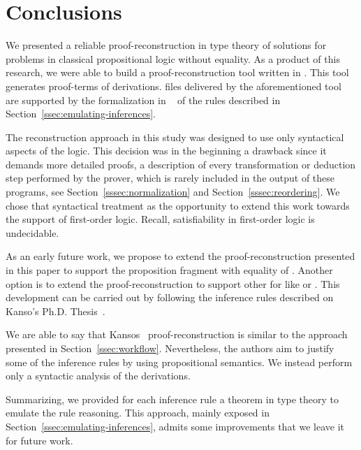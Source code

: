 \documentclass[../main.tex]{subfiles}
\begin{document}

\section{Conclusions}
\label{sec:conclusions}

We presented a reliable proof-reconstruction in type theory of \Metis
solutions for problems in classical propositional logic without
equality. As a product of this research, we were able to build a
proof-reconstruction tool written in \Haskell. This tool generates
\Agda proof-terms of \Metis \TSTP derivations. \Agda files
delivered by the aforementioned tool are supported by the
formalization in \Agda~\cite{AgdaProp,AgdaMetis} of the \Metis rules
described in Section~\ref{ssec:emulating-inferences}.

The reconstruction approach in this study was designed to use
only syntactical aspects of the logic.
This decision was in the beginning a drawback
since it demands more detailed proofs, a
description of every transformation or deduction step performed by
the prover, which is rarely included in the output of these programs,
see Section~\ref{sssec:normalization} and Section~\ref{sssec:reordering}.
We chose that syntactical treatment as the opportunity
to extend this work towards the support of first-order logic.
Recall, satisfiability in first-order logic is undecidable.

As an early future work, we propose to extend the
proof-reconstruction presented in this paper to support the
proposition fragment with equality of \Metis.
Another option is to extend the proof-reconstruction to support other \ATPs
for \CPL like  or .
This development can be carried out by following the 
inference rules described on Kanso's Ph.D. Thesis~\cite{Kanso2012}.

We are able to say that Kansos~\cite{Kanso2012} proof-reconstruction is 
similar to the approach presented in Section~\ref{ssec:workflow}.
Nevertheless, the authors aim to justify some of the inference
rules by using propositional semantics. We instead perform only a syntactic
analysis of the derivations.


Summarizing, we provided for each \Metis inference rule a theorem in
type theory to emulate the rule reasoning. This approach, mainly
exposed in Section~\ref{ssec:emulating-inferences},
admits some improvements that we leave it for future work. 
\end{document}
